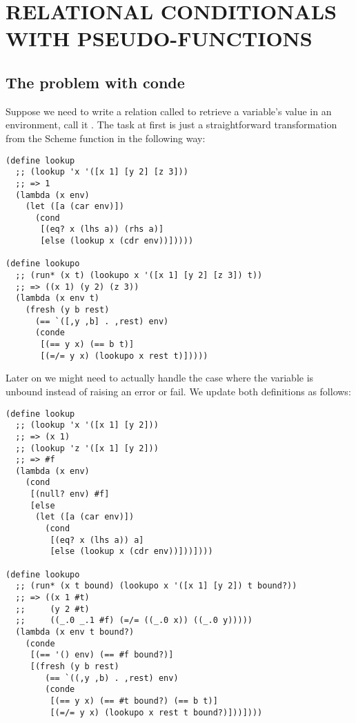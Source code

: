 \section{RELATIONAL CONDITIONALS WITH PSEUDO-FUNCTIONS}\label{reif}
\subsection{The problem with conde}
Suppose we need to write a relation called to retrieve a variable's value in an environment, call it . The task at first is just a straightforward transformation from the Scheme function  in the following way:
\begin{lstlisting}
(define lookup
  ;; (lookup 'x '([x 1] [y 2] [z 3]))
  ;; => 1
  (lambda (x env)
    (let ([a (car env)])
      (cond
       [(eq? x (lhs a)) (rhs a)]
       [else (lookup x (cdr env))]))))

(define lookupo
  ;; (run* (x t) (lookupo x '([x 1] [y 2] [z 3]) t))
  ;; => ((x 1) (y 2) (z 3))
  (lambda (x env t)
    (fresh (y b rest)
      (== `([,y ,b] . ,rest) env)
      (conde
       [(== y x) (== b t)]
       [(=/= y x) (lookupo x rest t)]))))
\end{lstlisting}

Later on we might need to actually handle the case where the variable is unbound instead of raising an error or fail. We update both definitions as follows:
\begin{lstlisting}
(define lookup
  ;; (lookup 'x '([x 1] [y 2]))
  ;; => (x 1)
  ;; (lookup 'z '([x 1] [y 2]))
  ;; => #f
  (lambda (x env)
    (cond
     [(null? env) #f]
     [else
      (let ([a (car env)])
        (cond
         [(eq? x (lhs a)) a]
         [else (lookup x (cdr env))]))])))

(define lookupo
  ;; (run* (x t bound) (lookupo x '([x 1] [y 2]) t bound?))
  ;; => ((x 1 #t)
  ;;     (y 2 #t)
  ;;     ((_.0 _.1 #f) (=/= ((_.0 x)) ((_.0 y)))))
  (lambda (x env t bound?)
    (conde
     [(== '() env) (== #f bound?)]
     [(fresh (y b rest)
        (== `((,y ,b) . ,rest) env)
        (conde
         [(== y x) (== #t bound?) (== b t)]
         [(=/= y x) (lookupo x rest t bound?)]))])))
\end{lstlisting}

